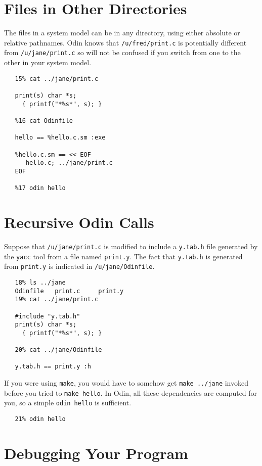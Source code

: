 \documentclass[hidelinks]{report}
\newcommand{\ex}{\tt}   %
\begin{document}
\section{Files in Other Directories}

The files in a system model can be in any directory, using either
absolute or relative pathnames.  Odin knows that {\ex /u/fred/print.c} is
potentially different from {\ex /u/jane/print.c} so will not be confused if
you switch from one to the other in your system model.
\begin{verbatim}
   15% cat ../jane/print.c

   print(s) char *s;
     { printf("*%s*", s); }

   %16 cat Odinfile

   hello == %hello.c.sm :exe

   %hello.c.sm == << EOF
      hello.c; ../jane/print.c
   EOF

   %17 odin hello
\end{verbatim}


\section {Recursive Odin Calls}

Suppose that {\ex /u/jane/print.c} is modified to include a {\ex y.tab.h}
file generated by the {\ex yacc} tool from a file named {\ex print.y}.
The fact that {\ex y.tab.h} is generated from {\ex print.y} is indicated
in {\ex /u/jane/Odinfile}.
\begin{verbatim}
   18% ls ../jane
   Odinfile   print.c     print.y
   19% cat ../jane/print.c

   #include "y.tab.h"
   print(s) char *s;
     { printf("*%s*", s); }

   20% cat ../jane/Odinfile

   y.tab.h == print.y :h
\end{verbatim}
If you were using {\ex make}, you would have to somehow get {\ex make ../jane}
invoked before you tried to {\ex make hello}.  In Odin, all these dependencies
are computed for you, so a simple {\ex odin hello} is sufficient.
\begin{verbatim}
   21% odin hello
\end{verbatim}


\section{Debugging Your Program}
\end{document}
